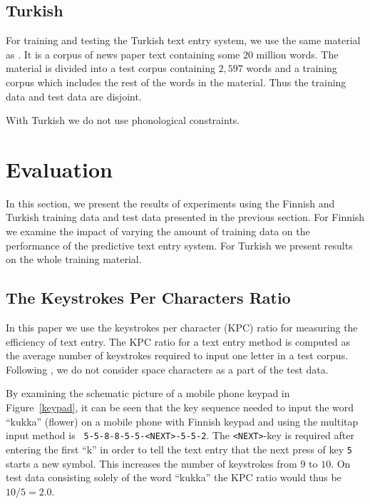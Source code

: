 \documentclass{llncs}
\begin{document}
\subsection{Turkish}

For training and testing the Turkish text entry system, we use the
same material as \cite{Tantug:2010}. It is a corpus of news paper text
containing some $20$ million words. The material is divided into a
test corpus containing $2,597$ words and a training corpus which
includes the rest of the words in the material. Thus the training data
and test data are disjoint.

With Turkish we do not use phonological constraints.

\section{Evaluation}\label{evaluation}

In this section, we present the results of experiments using the
Finnish and Turkish training data and test data presented in the
previous section. For Finnish we examine the impact of varying the
amount of training data on the performance of the predictive text
entry system. For Turkish we present results on the whole training
material.

\subsection{The Keystrokes Per Characters Ratio}

In this paper we use the keystrokes per character (KPC)
ratio for measuring the efficiency of text
entry. The KPC ratio for a text entry method is computed as the
average number of keystrokes required to input one letter in a test
corpus. Following \cite{Tantug:2010}, we do not consider space
characters as a part of the test data.

By examining the schematic picture of a mobile phone keypad in
Figure~\ref{keypad}, it can be seen that the key sequence needed to
input the word ``kukka'' (flower) on a mobile phone with Finnish keypad
and using the multitap input method is {\tt
  5-5-8-8-5-5-<NEXT>-5-5-2}. The {\tt <NEXT>}-key is required after
entering the first ``k'' in order to tell the text entry that the next
press of key {\tt 5} starts a new symbol. This increases the number of
keystrokes from $9$ to $10$. On test data consisting solely of
the word ``kukka'' the KPC ratio would thus be $10/5 = 2.0$.
\end{document}
